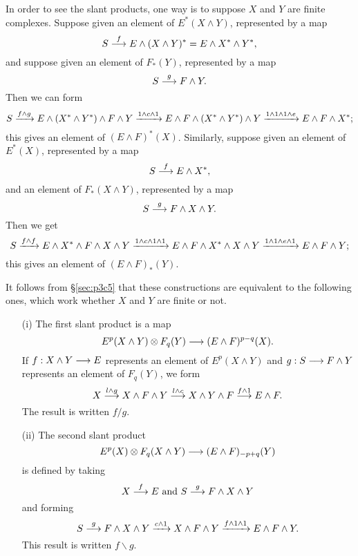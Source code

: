 \documentclass[../main]{subfiles}
\begin{document}
In order to see the slant products, one way is to suppose \(X\) and \(Y\) are finite complexes. Suppose given an element of \(E^\ast(X \wedge Y)\), represented by a map
$$S \overset{f}{\longrightarrow} E \wedge (X \wedge Y)^\ast = E \wedge X^\ast \wedge Y^\ast,$$
and suppose given an element of $F_\ast(Y)$, represented by a map 
$$S \overset{g}{\longrightarrow} F \wedge Y.$$
Then we can form
$$S \vra{f \wedge g} E \wedge (X^\ast \wedge Y^\ast) \wedge F \wedge Y \vra{1 \wedge c \wedge 1} E \wedge F \wedge (X^\ast \wedge Y^\ast) \wedge Y \vra{1 \wedge 1 \wedge 1 \wedge e} E \wedge F \wedge X^\ast;$$
this gives an element of $(E \wedge F)^\ast(X)$. Similarly, suppose given an element of $E^\ast(X)$, represented by a map 
$$S \overset{f}{\longrightarrow} E \wedge X^\ast,$$
and an element of $F_\ast(X \wedge Y)$, represented by a map 
$$S \overset{g}{\longrightarrow} F \wedge X \wedge Y.$$
Then we get
$$S \vra{f \wedge f} E \wedge X^\ast \wedge F \wedge X \wedge Y \vra{1 \wedge c \wedge 1 \wedge 1} E \wedge F \wedge X^\ast \wedge X \wedge Y \vra{1 \wedge 1 \wedge e \wedge 1} E \wedge F \wedge Y;$$
this gives an element of $(E \wedge F)_\ast(Y)$.

It follows from \S\ref{sec:p3c5} that these constructions are equivalent to the following ones, which work whether $X$ and $Y$ are finite or not. 
\begin{enumerate}
	\item[(i)] The first slant product is a map $$E^p(X \wedge Y) \otimes F_q(Y) \overset{}{\longrightarrow} (E \wedge F)^{p - q}(X).$$ 
	If $f : X \wedge Y \overset{}{\longrightarrow} E$ represents an element of $E^p(X \wedge Y)$ and $g : S \overset{}{\longrightarrow} F \wedge Y$ represents an element of $F_q(Y)$, we form
	$$X \overset{l \wedge g}{\longrightarrow} X \wedge F \wedge Y \overset{l \wedge c}{\longrightarrow} X \wedge Y \wedge F \overset{f \wedge 1}{\longrightarrow} E \wedge F.$$
	The result is written $f/g$.
	\item[(ii)] The second slant product $$E^p(X) \otimes F_q(X \wedge Y) \overset{}{\longrightarrow} (E \wedge F)_{-p + q}(Y)$$ is defined by taking $$X \overset{f}{\longrightarrow} E \text { and } S \overset{g}{\longrightarrow} F \wedge X \wedge Y$$ and forming $$S \lar{g} F \wedge X \wedge Y \vra{c \wedge 1} X \wedge F \wedge Y\vra{f \wedge 1 \wedge 1} E \wedge F \wedge Y.$$ This result is written $f \backslash g$.
\end{enumerate} 
\end{document}
